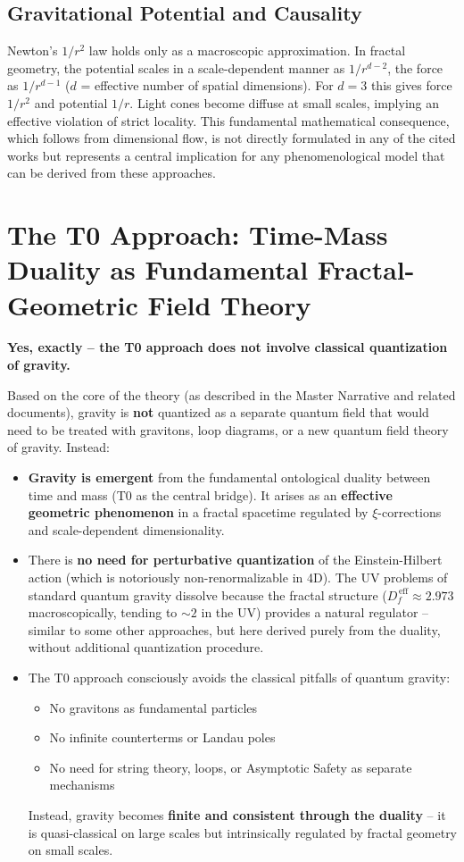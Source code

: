 	\subsection{Gravitational Potential and Causality}
	Newton's $1/r^2$ law holds only as a macroscopic approximation. In fractal geometry, the potential scales in a scale-dependent manner as $1/r^{d-2}$, the force as $1/r^{d-1}$ ($d$ = effective number of spatial dimensions). For $d = 3$ this gives force $1/r^2$ and potential $1/r$. Light cones become diffuse at small scales, implying an effective violation of strict locality. This fundamental mathematical consequence, which follows from dimensional flow, is not directly formulated in any of the cited works but represents a central implication for any phenomenological model that can be derived from these approaches.
	
	\section{The T0 Approach: Time-Mass Duality as Fundamental Fractal-Geometric Field Theory}
	
	\textbf{Yes, exactly – the T0 approach does not involve classical quantization of gravity.}
	
	Based on the core of the theory (as described in the Master Narrative and related documents), gravity is \textbf{not} quantized as a separate quantum field that would need to be treated with gravitons, loop diagrams, or a new quantum field theory of gravity. Instead:
	
	\begin{itemize}
		\item \textbf{Gravity is emergent} from the fundamental ontological duality between time and mass (T0 as the central bridge). It arises as an \textbf{effective geometric phenomenon} in a fractal spacetime regulated by $\xi$-corrections and scale-dependent dimensionality.
		
		\item There is \textbf{no need for perturbative quantization} of the Einstein-Hilbert action (which is notoriously non-renormalizable in 4D). The UV problems of standard quantum gravity dissolve because the fractal structure ($D_f^{\,\text{eff}} \approx 2.973$ macroscopically, tending to $\sim 2$ in the UV) provides a natural regulator – similar to some other approaches, but here derived purely from the duality, without additional quantization procedure.
		
		\item The T0 approach consciously avoids the classical pitfalls of quantum gravity:
		\begin{itemize}
			\item No gravitons as fundamental particles
			\item No infinite counterterms or Landau poles
			\item No need for string theory, loops, or Asymptotic Safety as separate mechanisms
		\end{itemize}
		Instead, gravity becomes \textbf{finite and consistent through the duality} – it is quasi-classical on large scales but intrinsically regulated by fractal geometry on small scales.
	\end{itemize}
	
